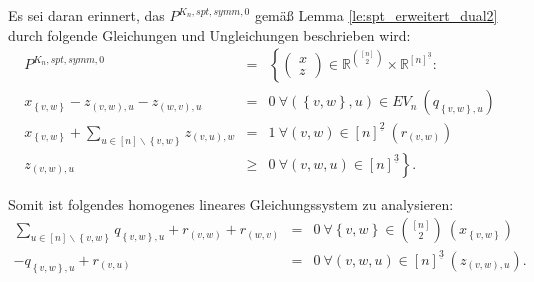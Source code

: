 \documentclass[10p,a4paper,BCOR = 12mm, DIV=15]{scrbook}
\begin{document}
Es sei daran erinnert, das $P^{K_n, spt, symm, 0}$ gemäß Lemma \ref{le:spt_erweitert_dual2} durch folgende Gleichungen und Ungleichungen beschrieben wird:
\begin{eqnarray*}
P^{K_n, spt, symm, 0} & = & \left\{
\left(\begin{array}{c}
x \\
z
\end{array}\right)\in\mathbb{R}^{[n]\choose 2}\times \mathbb{R}^{[n]^{\underline{3}}}: \right. \\
x_{\left\{v, w\right\}} - z_{\left(v, w\right), u} - z_{\left(w, v\right), u} & = & 0\ \forall \left(\left\{v, w\right\}, u\right)\in EV_n\ \left(q_{\left\{v, w\right\}, u}\right)\\
x_{\left\{v, w\right\}} + \sum_{u\in[n]\backslash\left\{v, w\right\}} z_{\left(v, u\right), w} & = & 1\ \forall \left(v, w\right)\in [n]^{\underline{2}} \ \left(r_{\left(v, w\right)}\right) \\
z_{\left(v, w\right), u} & \geq & \left.0\ \forall \left(v, w, u\right)\in [n]^{\underline{3}} \right\}.
\end{eqnarray*}

Somit ist folgendes homogenes lineares Gleichungssystem zu analysieren:
\begin{eqnarray*}
\sum_{u\in[n]\backslash\left\{v, w\right\}} q_{\left\{v, w\right\}, u} + r_{\left(v, w\right)} + r_{\left(w, v\right)} & = & 0\ \forall \left\{v, w\right\}\in {[n] \choose 2} \ \left(x_{\left\{v, w\right\}}\right) \\
-q_{\left\{v, w\right\}, u} + r_{\left(v, u\right)} & = & 0\ \forall \left(v, w, u\right)\in [n]^{\underline{3}} \ \left(z_{\left(v, w\right), u}\right).
\end{eqnarray*}
\end{document}
